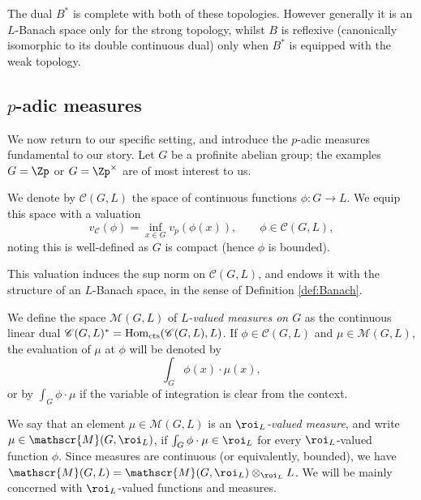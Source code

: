 \documentclass[a4paper,10pt, english, reqno]{smfart}
\numberwithin{equation}{section}
\begin{document}
\begin{remark}\label{rem:strong topology}
The dual $B^*$ is complete with both of these topologies. However generally it is an $L$-Banach space only for the strong topology, whilst $B$ is reflexive (canonically isomorphic to its double continuous dual) only when $B^*$ is equipped with the weak topology.
\end{remark}


   


\subsection{$p$-adic measures}\label{sec:p-adic measures 1}
We now return to our specific setting, and introduce the $p$-adic measures fundamental to our story. Let $G$ be a profinite abelian group; the examples $G = \Zp$ or $G = \Zp^\times$ are of most interest to us.

\begin{definition}\label{def:cts functions}
We denote by $\mathscr{C}(G, L)$ the space of continuous functions $\phi : G \to L$. We equip this space with a valuation 
\[
v_{\mathscr{C}}(\phi) = \inf_{x \in G} v_p(\phi(x)), \qquad \phi \in \mathscr{C}(G,L),
\]
noting this is well-defined as $G$ is compact (hence $\phi$ is bounded).
\end{definition}
This valuation induces the sup norm on $\mathscr{C}(G,L)$, and endows it with the structure of an $L$-Banach space, in the sense of Definition \ref{def:Banach}.


\begin{definition}\label{def:measures}
We define the space $\mathscr{M}(G, L)$ of \emph{$L$-valued measures on $G$} as the continuous linear dual $\mathscr{C}(G,L)^* = \mathrm{Hom}_{\rm cts}(\mathscr{C}(G, L), L)$.  If $\phi \in \mathscr{C}(G, L)$ and $\mu \in \mathscr{M}(G, L)$, the evaluation of $\mu$ at $\phi$ will be denoted by
\[ \int_G \phi(x) \cdot \mu(x), \]
or by $\int_G \phi \cdot \mu$ if the variable of integration is clear from the context.%

We say that an element $\mu \in \mathscr{M}(G, L)$ is an \emph{$\roi_L$-valued measure}, and write $\mu \in \mathscr{M}(G, \roi_L)$, if $\int_G \phi \cdot \mu \in \roi_L$ for every $\roi_L$-valued function $\phi$. Since measures are continuous (or equivalently, bounded), we have $\mathscr{M}(G, L) = \mathscr{M}(G, \roi_L) \otimes_{\roi_L} L$. We will be mainly concerned with $\roi_L$-valued functions and measures.
\end{definition}
\end{document}
